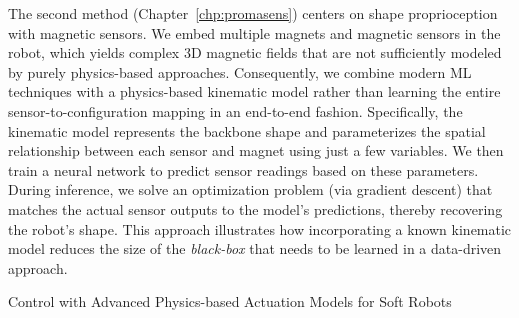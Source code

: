 The second method (Chapter~\ref{chp:promasens}) centers on shape proprioception with magnetic sensors. We embed multiple magnets and magnetic sensors in the robot, which yields complex 3D magnetic fields that are not sufficiently modeled by purely physics-based approaches. Consequently, we combine modern \gls{ML} techniques with a physics-based kinematic model rather than learning the entire sensor-to-configuration mapping in an end-to-end fashion. Specifically, the kinematic model represents the backbone shape and parameterizes the spatial relationship between each sensor and magnet using just a few variables. We then train a neural network to predict sensor readings based on these parameters. During inference, we solve an optimization problem (via gradient descent) that matches the actual sensor outputs to the model’s predictions, thereby recovering the robot’s shape. This approach illustrates how incorporating a known kinematic model reduces the size of the \emph{black-box} that needs to be learned in a data-driven approach.


\begin{contribution}\label{contrib:actuation_models}
    Control with Advanced Physics-based Actuation Models for Soft Robots
\end{contribution}

